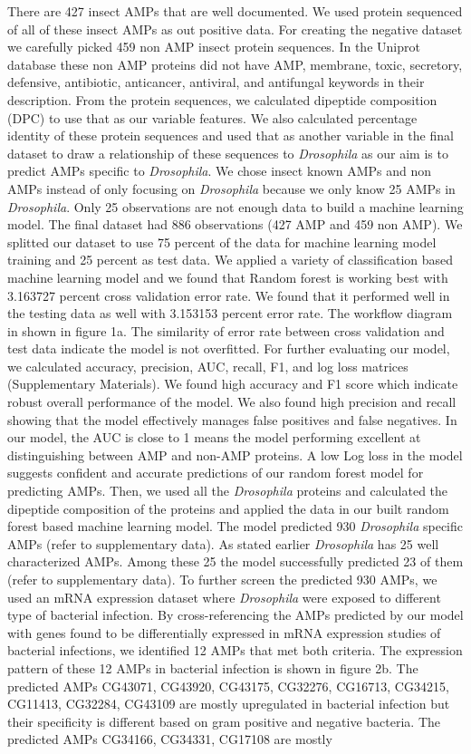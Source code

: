 \documentclass[letterpaper,11pt]{article}
\begin{document}
There are 427 insect AMPs that are well documented. We used protein sequenced of all of these insect AMPs as out positive data. For creating the negative dataset we carefully picked 459 non AMP insect protein sequences. In the Uniprot database these non AMP proteins did not have AMP, membrane, toxic, secretory, defensive, antibiotic, anticancer, antiviral, and antifungal keywords in their description. From the protein sequences, we calculated dipeptide composition (DPC) to use that as our variable features. We also calculated percentage identity of these protein sequences and used that as another variable in the final dataset to draw a relationship of these sequences to \textit{Drosophila} as our aim is to predict AMPs specific to \textit{Drosophila}. We chose insect known AMPs and non AMPs instead of only focusing on \textit{Drosophila} because we only know 25 AMPs in \textit{Drosophila}. Only 25 observations are not enough data to build a machine learning model. The final dataset had 886 observations (427 AMP and 459 non AMP). We splitted our dataset to use 75 percent of the data for machine learning model training and 25 percent as test data. We applied a variety of classification based machine learning model and we found that Random forest is working best with 3.163727 percent cross validation error rate. We found that it performed well in the testing data as well with 3.153153 percent error rate. The workflow diagram in shown in figure 1a. The similarity of error rate between cross validation and test data indicate the model is not overfitted. For further evaluating our model, we calculated accuracy, precision, AUC, recall, F1, and log loss matrices (Supplementary Materials). We found high accuracy and F1 score which indicate robust overall performance of the model. We also found high precision and recall showing that the model effectively manages false positives and false negatives. In our model, the AUC is close to 1 means the model performing excellent at distinguishing between AMP and non-AMP proteins. A low Log loss in the model suggests confident and accurate predictions of our random forest model for predicting AMPs. Then, we used all the \textit{Drosophila} proteins and calculated the dipeptide composition of the proteins and applied the data in our built random forest based machine learning model. The model predicted 930 \textit{Drosophila} specific AMPs (refer to supplementary data). As stated earlier \textit{Drosophila} has 25 well characterized AMPs. Among these 25 the model successfully predicted 23 of them (refer to supplementary data). To further screen the predicted 930 AMPs, we used an mRNA expression dataset where \textit{Drosophila} were exposed to different type of bacterial infection. By cross-referencing the AMPs predicted by our model with genes found to be differentially expressed in mRNA expression studies of bacterial infections, we identified 12 AMPs that met both criteria. The expression pattern of these 12 AMPs in bacterial infection is shown in figure 2b. The predicted AMPs CG43071, CG43920, CG43175, CG32276, CG16713, CG34215, CG11413, CG32284, CG43109 are mostly upregulated in bacterial infection but their specificity is different based on gram positive and negative bacteria. The predicted AMPs CG34166, CG34331, CG17108 are mostly 
\end{document}
